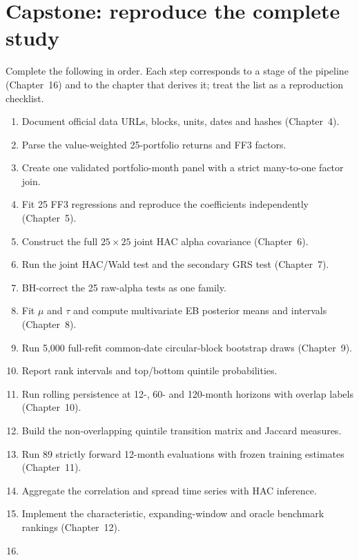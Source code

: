 \hypertarget{capstone}{}
\hypertarget{capstone-reproduce-the-complete-study}{%
\chapter{Capstone: reproduce the complete
study}\label{capstone-reproduce-the-complete-study}}

Complete the following in order. Each step corresponds to a stage of the
pipeline (Chapter~16) and to the chapter that derives it; treat the list as
a reproduction checklist.

\hypertarget{capstone-list}{}
\begin{enumerate}
\tightlist
\item
  Document official data URLs, blocks, units, dates and hashes (Chapter~4).
\item
  Parse the value-weighted 25-portfolio returns and FF3 factors.
\item
  Create one validated portfolio-month panel with a strict many-to-one
  factor join.
\item
  Fit 25 FF3 regressions and reproduce the coefficients independently
  (Chapter~5).
\item
  Construct the full $25\times25$ joint HAC alpha covariance (Chapter~6).
\item
  Run the joint HAC/Wald test and the secondary GRS test (Chapter~7).
\item
  BH-correct the 25 raw-alpha tests as one family.
\item
  Fit $\mu$ and $\tau$ and compute multivariate EB posterior means and
  intervals (Chapter~8).
\item
  Run 5{,}000 full-refit common-date circular-block bootstrap draws
  (Chapter~9).
\item
  Report rank intervals and top/bottom quintile probabilities.
\item
  Run rolling persistence at 12-, 60- and 120-month horizons with overlap
  labels (Chapter~10).
\item
  Build the non-overlapping quintile transition matrix and Jaccard
  measures.
\item
  Run 89 strictly forward 12-month evaluations with frozen training
  estimates (Chapter~11).
\item
  Aggregate the correlation and spread time series with HAC inference.
\item
  Implement the characteristic, expanding-window and oracle benchmark
  rankings (Chapter~12).
\item

\end{enumerate}
